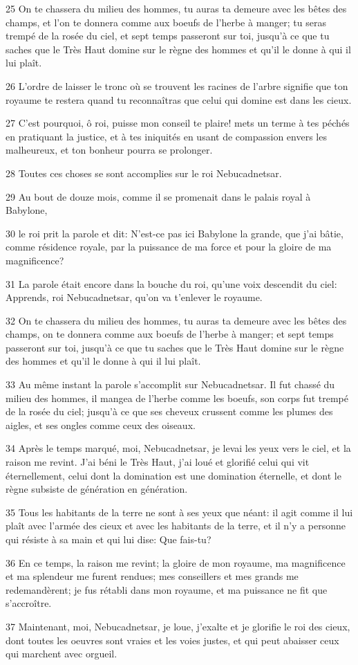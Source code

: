 \par 25 On te chassera du milieu des hommes, tu auras ta demeure avec les bêtes des champs, et l'on te donnera comme aux boeufs de l'herbe à manger; tu seras trempé de la rosée du ciel, et sept temps passeront sur toi, jusqu'à ce que tu saches que le Très Haut domine sur le règne des hommes et qu'il le donne à qui il lui plaît.
\par 26 L'ordre de laisser le tronc où se trouvent les racines de l'arbre signifie que ton royaume te restera quand tu reconnaîtras que celui qui domine est dans les cieux.
\par 27 C'est pourquoi, ô roi, puisse mon conseil te plaire! mets un terme à tes péchés en pratiquant la justice, et à tes iniquités en usant de compassion envers les malheureux, et ton bonheur pourra se prolonger.
\par 28 Toutes ces choses se sont accomplies sur le roi Nebucadnetsar.
\par 29 Au bout de douze mois, comme il se promenait dans le palais royal à Babylone,
\par 30 le roi prit la parole et dit: N'est-ce pas ici Babylone la grande, que j'ai bâtie, comme résidence royale, par la puissance de ma force et pour la gloire de ma magnificence?
\par 31 La parole était encore dans la bouche du roi, qu'une voix descendit du ciel: Apprends, roi Nebucadnetsar, qu'on va t'enlever le royaume.
\par 32 On te chassera du milieu des hommes, tu auras ta demeure avec les bêtes des champs, on te donnera comme aux boeufs de l'herbe à manger; et sept temps passeront sur toi, jusqu'à ce que tu saches que le Très Haut domine sur le règne des hommes et qu'il le donne à qui il lui plaît.
\par 33 Au même instant la parole s'accomplit sur Nebucadnetsar. Il fut chassé du milieu des hommes, il mangea de l'herbe comme les boeufs, son corps fut trempé de la rosée du ciel; jusqu'à ce que ses cheveux crussent comme les plumes des aigles, et ses ongles comme ceux des oiseaux.
\par 34 Après le temps marqué, moi, Nebucadnetsar, je levai les yeux vers le ciel, et la raison me revint. J'ai béni le Très Haut, j'ai loué et glorifié celui qui vit éternellement, celui dont la domination est une domination éternelle, et dont le règne subsiste de génération en génération.
\par 35 Tous les habitants de la terre ne sont à ses yeux que néant: il agit comme il lui plaît avec l'armée des cieux et avec les habitants de la terre, et il n'y a personne qui résiste à sa main et qui lui dise: Que fais-tu?
\par 36 En ce temps, la raison me revint; la gloire de mon royaume, ma magnificence et ma splendeur me furent rendues; mes conseillers et mes grands me redemandèrent; je fus rétabli dans mon royaume, et ma puissance ne fit que s'accroître.
\par 37 Maintenant, moi, Nebucadnetsar, je loue, j'exalte et je glorifie le roi des cieux, dont toutes les oeuvres sont vraies et les voies justes, et qui peut abaisser ceux qui marchent avec orgueil.

